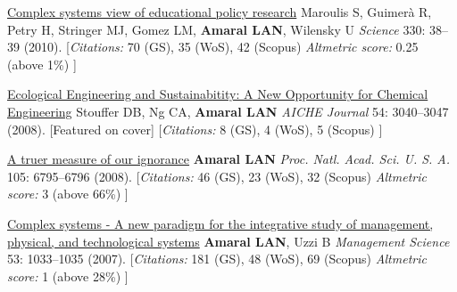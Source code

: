 \NumberedItem{\makebox[0.8cm][r]{[8]}}
\href{/people/amaral/complex-systems-view-educational-policy-research}
{Complex systems view of educational policy research}
\newline
Maroulis S, Guimer\`a R, Petry H, Stringer MJ, Gomez LM, {\textbf{Amaral LAN}}, Wilensky U
\newline
\textit{Science}
    330:
38--39 (2010).
    \newline
    \hfill [{\em{Citations:}} 70 (GS),
    35 (WoS), 42 (Scopus)
        {\hspace*{1cm} \em{Altmetric score:}}  0.25 (above 1\%)
    ]
\newline
\Gap
~
\Gap

\NumberedItem{\makebox[0.8cm][r]{[7]}}
\href{/people/amaral/ecological-engineering-and-sustainabitity-a-new-opportunity-for-chemical-engineering}
{Ecological Engineering and Sustainabitity: A New Opportunity for Chemical Engineering}
\newline
Stouffer DB, Ng CA, {\textbf{Amaral LAN}}
\newline
\textit{AICHE Journal}
    54:
3040--3047 (2008).
    [Featured on cover]
    \newline
    \hfill [{\em{Citations:}} 8 (GS),
    4 (WoS), 5 (Scopus)
    ]
\newline
\Gap
~
\Gap

\NumberedItem{\makebox[0.8cm][r]{[6]}}
\href{/people/amaral/a-truer-measure-of-our-ignorance}
{A truer measure of our ignorance}
\newline
{\textbf{Amaral LAN}}
\newline
\textit{Proc. Natl. Acad. Sci. U. S. A.}
    105:
6795--6796 (2008).
    \newline
    \hfill [{\em{Citations:}} 46 (GS),
    23 (WoS), 32 (Scopus)
        {\hspace*{1cm} \em{Altmetric score:}}  3 (above 66\%)
    ]
\newline
\Gap
~
\Gap

\NumberedItem{\makebox[0.8cm][r]{[5]}}
\href{/people/amaral/complex-systems-a-new-paradigm-for-the-integrative-study-of-management-physical-and-technological-systems}
{Complex systems - A new paradigm for the integrative study of management, physical, and technological systems}
\newline
{\textbf{Amaral LAN}}, Uzzi B
\newline
\textit{Management Science}
    53:
1033--1035 (2007).
    \newline
    \hfill [{\em{Citations:}} 181 (GS),
    48 (WoS), 69 (Scopus)
        {\hspace*{1cm} \em{Altmetric score:}}  1 (above 28\%)
    ]
\newline
\Gap
~
\Gap

